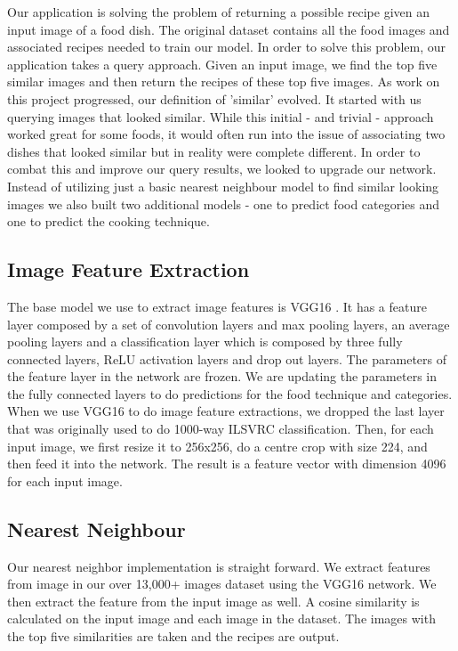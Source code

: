 \documentclass[10pt,twocolumn,letterpaper]{article}
\begin{document}
Our application is solving the problem of returning a possible recipe given an input image of a food dish. The original dataset contains all the food images and associated recipes needed to train our model. In order to solve this problem, our application takes a query approach. Given an input image, we find the top five similar images and then return the recipes of these top five images. As work on this project progressed, our definition of 'similar' evolved. It started with us querying images that looked similar. While this initial - and trivial - approach worked great for some foods, it would often run into the issue of associating two dishes that looked similar but in reality were complete different. In order to combat this and improve our query results, we looked to upgrade our network. Instead of utilizing just a basic nearest neighbour model to find similar looking images we also built two additional models - one to predict food categories and one to predict the cooking technique.
\subsection{Image Feature Extraction}
The base model we use to extract image features is VGG16 \cite{Authors01}. It has a feature layer composed by a set of convolution layers and max pooling layers, an average pooling layers and a classification layer which is composed by three fully connected layers, ReLU activation layers and drop out layers. 
The parameters of the feature layer in the network are frozen. We are updating the parameters in the fully connected layers to do predictions for the food technique and categories. When we use VGG16 to do image feature extractions, we dropped the last layer that was originally used to do 1000-way ILSVRC classification. Then, for each input image, we first resize it to 256x256, do a centre crop with size 224, and then feed it into the network. The result is a feature vector with dimension 4096 for each input image.
\subsection{Nearest Neighbour}
Our nearest neighbor implementation is straight forward. We extract features from image in our over 13,000+ images dataset using the VGG16 network.
We then extract the feature from the input image as well. A cosine similarity is calculated on the input image and each image in the dataset. The images with the top five similarities are taken and the recipes are output.
\end{document}
